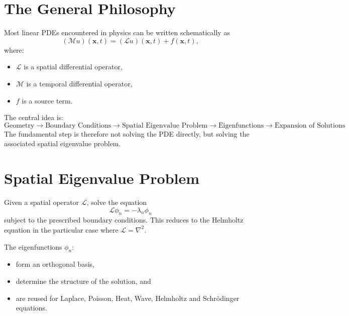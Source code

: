 \documentclass[aps,prl,twocolumn,groupedaddress]{revtex4-2}
\begin{document}
\maketitle
\onecolumngrid


\section{The General Philosophy}

Most linear PDEs encountered in physics can be written schematically as
$$
(\mathcal M u)(\mathbf x,t)
=
(\mathcal L u)(\mathbf x,t)
+
f(\mathbf x,t),
$$
where:
\begin{itemize}
\item $\mathcal L$ is a spatial differential operator,
\item $\mathcal M$ is a temporal differential operator,
\item $f$ is a source term.
\end{itemize}
The central idea is:
$$
\boxed{
\text{Geometry}
\rightarrow
\text{Boundary Conditions}
\rightarrow
\text{Spatial Eigenvalue Problem}
\rightarrow
\text{Eigenfunctions}
\rightarrow
\text{Expansion of Solutions}
}
$$
The fundamental step is therefore not solving the PDE directly, but solving the associated spatial eigenvalue problem.

\section{Spatial Eigenvalue Problem}

Given a spatial operator $\mathcal L$, solve the equation
$$
\mathcal L \phi_n
=
-\lambda_n \phi_n
$$
subject to the prescribed boundary conditions.
This reduces to the Helmholtz equation in the particular case where $\mathcal L=\nabla^2$.


The eigenfunctions ${\phi_n}$:
\begin{itemize}
\item form an orthogonal basis,
\item determine the structure of the solution, and
\item are reused for Laplace, Poisson, Heat, Wave, Helmholtz and Schr\"odinger equations.
\end{itemize}
\end{document}
